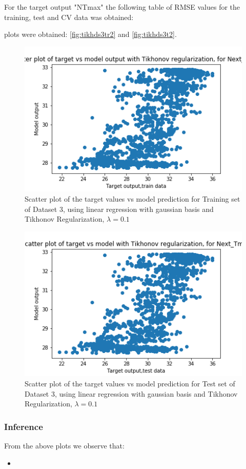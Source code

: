 \documentclass[12pt,a4paper]{article}
\begin{document}
 For the target output "NTmax" the following table of RMSE values for the training, test and CV data was obtained:

 plots were obtained: \autoref{fig:tikhds3tr2} and \autoref{fig:tikhds3t2}.
\begin{figure}[H]
     \centering
     \includegraphics[scale=0.5]{images/scatter_ds3tikhtrainT_max.png}
     \caption{Scatter plot of the target values vs model prediction for Training set of Dataset 3, using linear regression with gaussian basis and Tikhonov Regularization, $\lambda = 0.1 $}
     \label{fig:tikhds3tr2}
\end{figure}
\begin{figure}[H]
     \centering
     \includegraphics[scale=0.5]{images/scatter_ds3tikhtestT_max.png}
     \caption{Scatter plot of the target values vs model prediction for Test set of Dataset 3, using linear regression with gaussian basis and Tikhonov Regularization, $\lambda = 0.1 $}
     \label{fig:tikhds3t2}
\end{figure}

\subsubsection{Inference}
From the above plots we observe that:
\begin{itemize}
    \itemsep0em
    \item 
\end{itemize}
\end{document}
